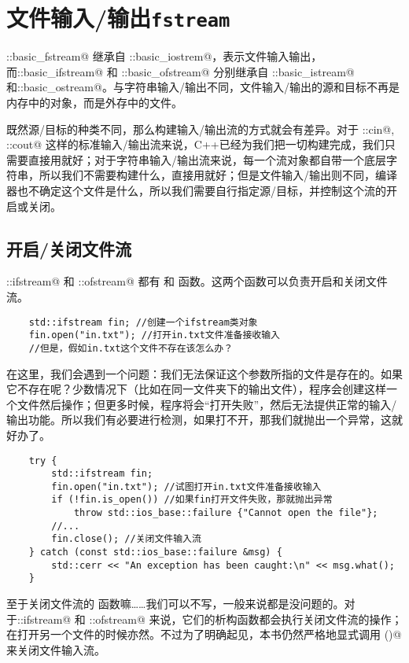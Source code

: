 \section{文件输入/输出\texttt{fstream}}
\lstinline@std::basic_fstream@ 继承自 \lstinline@std::basic_iostrem@，表示文件输入输出，而\newline\lstinline@std::basic_ifstream@ 和 \lstinline@std::basic_ofstream@ 分别继承自 \lstinline@std::basic_istream@ 和\newline\lstinline@std::basic_ostream@。与字符串输入/输出不同，文件输入/输出的源和目标不再是内存中的对象，而是外存中的文件。\par
既然源/目标的种类不同，那么构建输入/输出流的方式就会有差异。对于 \lstinline@std::cin@, \lstinline@std::cout@ 这样的标准输入/输出流来说，C++已经为我们把一切构建完成，我们只需要直接用就好；对于字符串输入/输出流来说，每一个流对象都自带一个底层字符串，所以我们不需要构建什么，直接用就好；但是文件输入/输出则不同，编译器也不确定这个文件是什么，所以我们需要自行指定源/目标，并控制这个流的开启或关闭。
\subsection*{开启/关闭文件流}
\lstinline@std::ifstream@ 和 \lstinline@std::ofstream@ 都有 \lstinline@open@ 和 \lstinline@close@ 函数。这两个函数可以负责开启和关闭文件流。\par
\begin{lstlisting}
    std::ifstream fin; //创建一个ifstream类对象
    fin.open("in.txt"); //打开in.txt文件准备接收输入
    //但是，假如in.txt这个文件不存在该怎么办？
\end{lstlisting}\par
在这里，我们会遇到一个问题：我们无法保证这个参数所指的文件是存在的。如果它不存在呢？少数情况下（比如在同一文件夹下的输出文件），程序会创建这样一个文件然后操作；但更多时候，程序将会``打开失败''，然后无法提供正常的输入/输出功能。所以我们有必要进行检测，如果打不开，那我们就抛出一个异常，这就好办了。
\begin{lstlisting}
    try {
        std::ifstream fin;
        fin.open("in.txt"); //试图打开in.txt文件准备接收输入
        if (!fin.is_open()) //如果fin打开文件失败，那就抛出异常
            throw std::ios_base::failure {"Cannot open the file"};
        //...
        fin.close(); //关闭文件输入流
    } catch (const std::ios_base::failure &msg) {
        std::cerr << "An exception has been caught:\n" << msg.what();
    }
\end{lstlisting}\par
至于关闭文件流的 \lstinline@close@ 函数嘛……我们可以不写，一般来说都是没问题的。对于\newline\lstinline@std::ifstream@ 和 \lstinline@std::ofstream@ 来说，它们的析构函数都会执行关闭文件流的操作；在打开另一个文件的时候亦然。不过为了明确起见，本书仍然严格地显式调用 \lstinline@close()@ 来关闭文件输入流。\par
